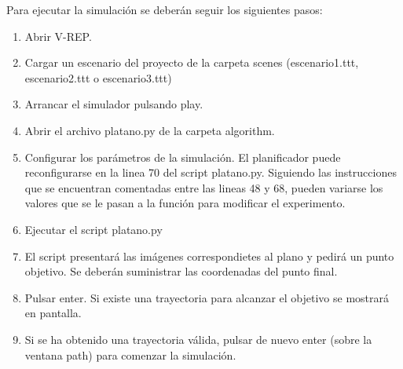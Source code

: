 Para ejecutar la simulación se deberán seguir los siguientes pasos:
\begin{enumerate}
	\item Abrir V-REP.
	\item Cargar un escenario del proyecto de la carpeta scenes (escenario1.ttt, escenario2.ttt o escenario3.ttt)
	\item Arrancar el simulador pulsando play.
	\item Abrir el archivo platano.py de la carpeta algorithm.
	\item Configurar los parámetros de la simulación. El planificador puede reconfigurarse en la linea 70 del script platano.py. Siguiendo las instrucciones que se encuentran comentadas entre las lineas 48 y 68, pueden variarse los valores que se le pasan a la función para modificar el experimento.
	\item Ejecutar el script platano.py
	\item El script presentará las imágenes correspondietes al plano y pedirá un punto objetivo. Se deberán suministrar las coordenadas del punto final.
	\item Pulsar enter. Si existe una trayectoria para alcanzar el objetivo se mostrará en pantalla.
	\item Si se ha obtenido una trayectoria válida, pulsar de nuevo enter (sobre la ventana path) para comenzar la simulación.
\end{enumerate}
